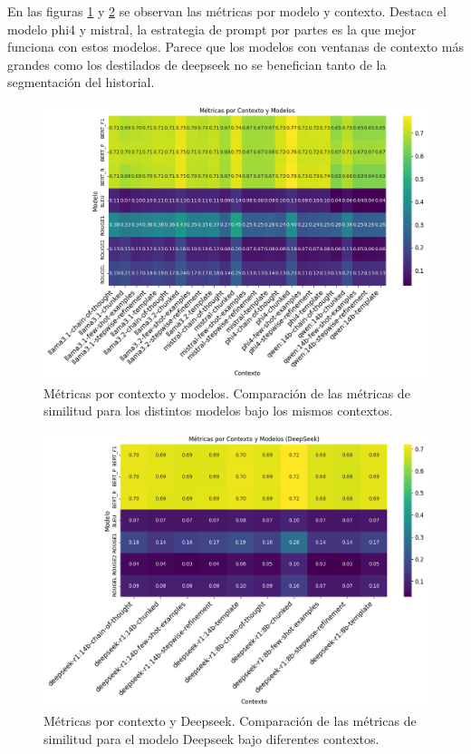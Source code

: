 \documentclass[../main.tex]{subfiles}
\begin{document}
En las figuras \ref{fig:metricas_por_contexto_modelos} y  \ref{fig:metricas_por_contexto_deepseek} se observan las métricas por modelo y contexto. Destaca el modelo phi4 y mistral, la estrategia de prompt por partes es la que mejor funciona con estos modelos. Parece que los modelos con ventanas de contexto más grandes como los destilados de deepseek no se benefician tanto de la segmentación del historial.

\begin{figure}[H]
    \centering
    \includegraphics[width=.9\textwidth]{images/metricas_por_contexto_modelos.png}
    \caption{Métricas por contexto y modelos. Comparación de las métricas de similitud para los distintos modelos bajo los mismos contextos.}
    \label{fig:metricas_por_contexto_modelos}
\end{figure}

\begin{figure}[H]
    \centering
    \includegraphics[width=.9\textwidth]{images/metricas_por_contexto_deepseek.png}
    \caption{Métricas por contexto y Deepseek. Comparación de las métricas de similitud para el modelo Deepseek bajo diferentes contextos.}
    \label{fig:metricas_por_contexto_deepseek}
\end{figure}
\end{document}
